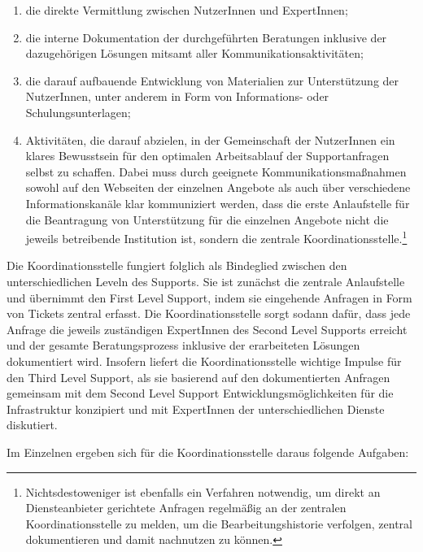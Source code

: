 \documentclass[a4paper,
fontsize=11pt,
oneside,
numbers=noperiodatend,
parskip=half-,
bibliography=totoc,
final
]{scrartcl}
\begin{document}
\begin{enumerate}
\def\labelenumi{\arabic{enumi}.}
\item
  die direkte Vermittlung zwischen NutzerInnen und ExpertInnen;
\item
  die interne Dokumentation der durchgeführten Beratungen inklusive der
  dazugehörigen Lösungen mitsamt aller Kommunikationsaktivitäten;
\item
  die darauf aufbauende Entwicklung von Materialien zur Unterstützung
  der NutzerInnen, unter anderem in Form von Informations- oder
  Schulungsunterlagen;
\item
  Aktivitäten, die darauf abzielen, in der Gemeinschaft der NutzerInnen
  ein klares Bewusstsein für den optimalen Arbeitsablauf der
  Supportanfragen selbst zu schaffen. Dabei muss durch geeignete
  Kommunikationsmaßnahmen sowohl auf den Webseiten der einzelnen
  Angebote als auch über verschiedene Informationskanäle klar
  kommuniziert werden, dass die erste Anlaufstelle für die Beantragung
  von Unterstützung für die einzelnen Angebote nicht die jeweils
  betreibende Institution ist, sondern die zentrale
  Koordinationsstelle.\footnote{Nichtsdestoweniger ist ebenfalls ein
    Verfahren notwendig, um direkt an Diensteanbieter gerichtete
    Anfragen regelmäßig an der zentralen Koordinationsstelle zu melden,
    um die Bearbeitungshistorie verfolgen, zentral dokumentieren und
    damit nachnutzen zu können.}
\end{enumerate}

Die Koordinationsstelle fungiert folglich als Bindeglied zwischen den
unterschiedlichen Leveln des Supports. Sie ist zunächst die zentrale
Anlaufstelle und übernimmt den First Level Support, indem sie eingehende
Anfragen in Form von Tickets zentral erfasst. Die Koordinationsstelle
sorgt sodann dafür, dass jede Anfrage die jeweils zuständigen
ExpertInnen des Second Level Supports erreicht und der gesamte
Beratungsprozess inklusive der erarbeiteten Lösungen dokumentiert wird.
Insofern liefert die Koordinationsstelle wichtige Impulse für den Third
Level Support, als sie basierend auf den dokumentierten Anfragen
gemeinsam mit dem Second Level Support Entwicklungsmöglichkeiten für die
Infrastruktur konzipiert und mit ExpertInnen der unterschiedlichen
Dienste diskutiert.

Im Einzelnen ergeben sich für die Koordinationsstelle daraus folgende
Aufgaben:
\end{document}
